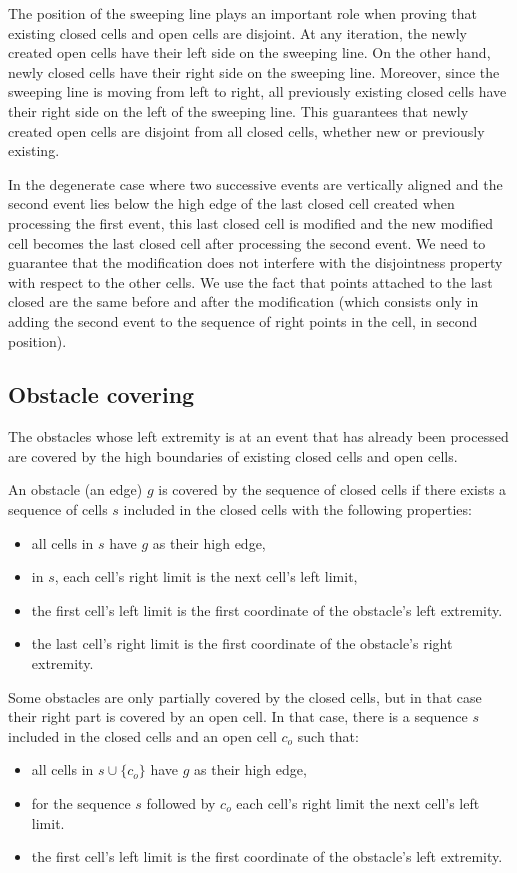 \documentclass[a4paper, USenglish, cleveref, autoref, thm-restate, final]{lipics-v2021}
\begin{document}
The position of the sweeping line plays an important role when proving
that existing closed cells and open cells are disjoint.  At any
iteration, the newly created open cells have their left side on the
sweeping line.  On the other hand, newly closed cells have their right
side on the sweeping line.  Moreover, since the sweeping line is moving
from left to right, all previously existing closed cells have their
right side on the left of the sweeping line.  This guarantees that newly
created open cells are disjoint from all closed cells, whether new or
previously existing.

In the degenerate case where two successive events are vertically
aligned and the second event lies below the high edge of the last
closed cell created when processing the first event, this last closed
cell is modified and the new modified cell becomes the last closed
cell after processing the second event.  We need to guarantee that
the modification does not interfere with the disjointness property with
respect to the other cells.  We use the fact that
points attached to the last closed are the same before and after the
modification (which consists only in adding the second event to the
sequence of right points in the cell, in second position).
\subsection{Obstacle covering}
The obstacles whose left extremity is at an event that has already been
processed are covered by the high boundaries of existing closed cells and
open cells.

An obstacle (an edge) \(g\) is covered by the sequence of closed cells if
there exists a sequence of cells \(s\) included in the closed cells
with the following properties:
\begin{itemize}
\item all cells in \(s\) have \(g\) as their high edge,
\item in \(s\), each cell's right limit is the next cell's left limit,
\item the first cell's left limit is the first coordinate of the obstacle's
  left extremity.
\item the last cell's right limit is the first coordinate of the obstacle's
  right extremity.
\end{itemize}
Some obstacles are only partially covered by the closed cells, but in that
case their right part is covered by an open cell.  In that case, there
is a sequence \(s\) included in the closed cells
and an open cell \(c_o\) such that:
\begin{itemize}
\item all cells in \(s \cup \{c_o\}\) have \(g\) as their high edge,
\item for the sequence \(s\) followed by \(c_o\) each cell's right limit
  the next cell's left limit.
\item the first cell's left limit is the first coordinate of the obstacle's
  left extremity.
\end{itemize}
\end{document}
